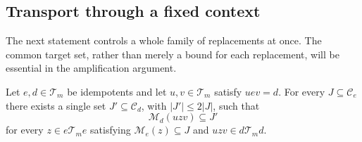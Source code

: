 \subsection{Transport through a fixed context}

The next statement controls a whole family of replacements at once.
The common target set, rather than merely a bound for each replacement,
will be essential in the amplification argument.

\begin{lemma}[Transport]\label{diag:transport}
Let $e,d\in\mathcal T_m$ be idempotents and let $u,v\in\mathcal T_m$
satisfy $uev=d$. For every $J\subseteq\mathcal C_e$ there exists a single
set $J'\subseteq\mathcal C_d$, with $|J'|\le2|J|$, such that
\[
 \mathcal M_d(uzv)\subseteq J'
\]
for every $z\in e\mathcal T_me$ satisfying
$\mathcal M_e(z)\subseteq J$ and $uzv\in d\mathcal T_md$.
\end{lemma}

